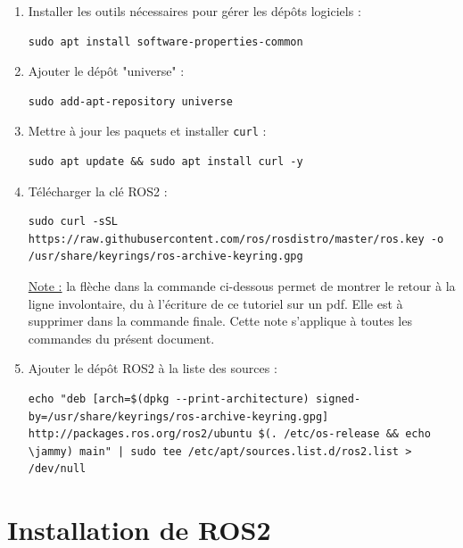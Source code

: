\begin{enumerate}
\item Installer les outils nécessaires pour gérer les dépôts logiciels :
\begin{lstlisting}[style=commandstyle]
sudo apt install software-properties-common
\end{lstlisting}

\item Ajouter le dépôt "universe" :
\begin{lstlisting}[style=commandstyle]
sudo add-apt-repository universe
\end{lstlisting}

\item Mettre à jour les paquets et installer \texttt{curl} :
\begin{lstlisting}[style=commandstyle]
sudo apt update && sudo apt install curl -y
\end{lstlisting}

\item Télécharger la clé ROS2 :
\begin{lstlisting}[style=commandstyle]
sudo curl -sSL https://raw.githubusercontent.com/ros/rosdistro/master/ros.key -o /usr/share/keyrings/ros-archive-keyring.gpg
\end{lstlisting}

\noindent \underline{Note :} la flèche dans la commande ci-dessous permet de montrer le retour à la ligne involontaire, du à l'écriture de ce tutoriel sur un pdf. Elle est à supprimer dans la commande finale. Cette note s'applique à toutes les commandes du présent document.

\item Ajouter le dépôt ROS2 à la liste des sources :
\begin{lstlisting}[style=commandstyle]
echo "deb [arch=$(dpkg --print-architecture) signed-by=/usr/share/keyrings/ros-archive-keyring.gpg] http://packages.ros.org/ros2/ubuntu $(. /etc/os-release && echo \jammy) main" | sudo tee /etc/apt/sources.list.d/ros2.list > /dev/null
\end{lstlisting}
\end{enumerate}

\section{Installation de ROS2}

